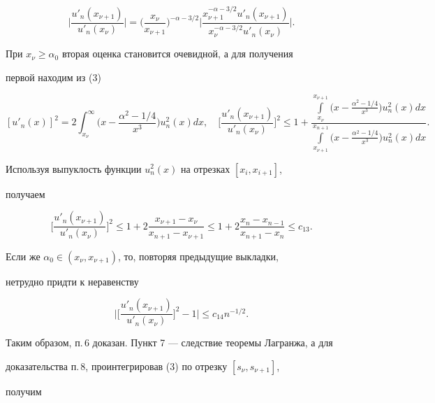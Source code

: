 $$


\bigg|\frac{u'_n(x_{\nu+1})}{u'_n(x_\nu)}\bigg|=


\bigg(\frac{x_\nu}{x_{\nu+1}}\bigg)^{-\alpha-{3/2}}


\bigg|\frac{x^{-\alpha-3/2}_{\nu+1}u'_n(x_{\nu+1})}


{x^{-\alpha-3/2}_\nu u'_n(x_\nu)}\bigg|.


$$


При $x_\nu\geq\alpha_0$ вторая оценка становится очевидной, а для получения 


первой находим из (3)


$$


[u'_n(x)]^2=2\int^\infty_{x_\nu}\bigg(x-\frac{\alpha^2-1/4}{x^3} 


\bigg){u^2_n(x)}dx,\quad


\bigg[\frac{u'_n(x_{\nu+1})}{u'_n(x_\nu)}\bigg]^2\leq 1+


\frac


{\int\limits^{x_{\nu+1}}_{x_\nu}


\Big(x-\frac{\alpha^2-1/4}{x^3}\Big){u^2_n(x)}dx}


{\int\limits^{x_{n+1}}_{x_{\nu+1}}


\Big(x-\frac{\alpha^2-1/4}{x^3}\Big)u^2_n(x)dx}.


$$


Используя выпуклость функции $u_n^2(x)$ на отрезках $[x_i,x_{i+1}]$,


получаем


$$


\bigg[\frac{u'_n(x_{\nu+1})}{u'_n(x_\nu)}\bigg]^2\leq


1+2\frac{x_{\nu+1}-x_\nu}{x_{n+1}-x_{\nu+1}}\leq


1+2\frac{x_n-x_{n-1}}{x_{n+1}-x_n}\leq c_{13}.


$$


Если же $\alpha_0\in(x_\nu,x_{\nu+1})$, то, повторяя предыдущие выкладки, 


нетрудно придти к неравенству


$$


\bigg|\bigg[\frac{u'_n(x_{\nu+1})}


{u'_n(x_\nu)}\bigg]^2-1\bigg|\leq c_{14}n^{-1/2}.


$$


Таким образом, п.\,6 доказан. Пункт 7 --- следствие теоремы Лагранжа, а для


доказательства п.\,8, проинтегрировав (3) по отрезку $[s_\nu,s_{\nu+1}]$,


получим


